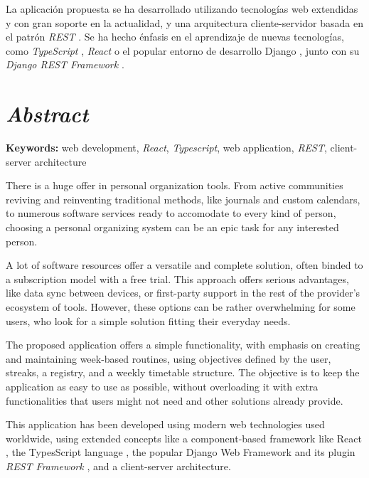 \documentclass[10pt, a4paper]{aqademic}
\begin{document}
\medskip

La aplicación propuesta se ha desarrollado utilizando tecnologías web extendidas y con gran soporte en la actualidad, y una arquitectura cliente-servidor basada en el patrón \textit{REST} \cite{fielding2000architectural}. Se ha hecho énfasis en el aprendizaje de nuevas tecnologías, como \textit{TypeScript} \cite{bierman2014understanding}, \textit{React} \cite{react} o el popular entorno de desarrollo Django \cite{django}, junto con su \textit{Django REST Framework} \cite{drf}.


\section*{\textit{Abstract}}

\textbf{Keywords:} web development, \textit{React}, \textit{Typescript}, web application, \textit{REST}, client-server architecture

\bigskip

There is a huge offer in personal organization tools. From active communities reviving and reinventing traditional methods, like journals and custom calendars, 
to numerous software services ready to accomodate to every kind of person, choosing a personal organizing system can be an epic task for any interested person.

\medskip

A lot of software resources offer a versatile and complete solution, often binded to a subscription model with a free trial. This approach offers serious advantages, like data sync between devices, or first-party support in the rest of the provider's ecosystem of tools. However, these options can be rather overwhelming for some users, who look for a simple solution fitting their everyday needs.

\medskip

The proposed application offers a simple functionality, with emphasis on creating and maintaining week-based routines, using objectives defined by the user, streaks, a registry, and a weekly timetable structure. The objective is to keep the application as easy to use as possible, without overloading it with extra functionalities that users might not need and other solutions already provide. 

\medskip

This application has been developed using modern web technologies used worldwide, using extended concepts like a component-based framework like React \cite{react},
the TypesScript language \cite{bierman2014understanding}, the popular Django Web Framework \cite{django} and its plugin \textit{REST Framework} \cite{drf}, and a client-server architecture.
\end{document}
